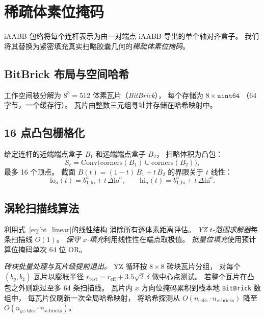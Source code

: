 \documentclass[journal]{IEEEtran}
\begin{document}
\section{稀疏体素位掩码}\label{sec:voxel}

iAABB 包络将每个连杆表示为由一对端点 iAABB 导出的单个轴对齐盒子。
我们将其替换为紧密填充真实扫略胶囊几何的\emph{稀疏体素位掩码}。

\subsection{BitBrick 布局与空间哈希}\label{sec:bitbrick}

工作空间被分解为 $8^3{=}512$ 体素瓦片（\emph{BitBrick}），
每个存储为 $8{\times}\mathtt{uint64}$
（64 字节，一个缓存行）。
瓦片由整数三元组寻址并存储在哈希映射中。

\subsection{16 点凸包栅格化}\label{sec:hull16}

给定连杆的近端端点盒子 $B_1$ 和远端端点盒子 $B_2$，
扫略体积为凸包：
\begin{equation}\label{eq:hull16}
  S_\ell = \mathrm{Conv}\bigl(
    \mathrm{corners}(B_1) \cup \mathrm{corners}(B_2)
  \bigr),
\end{equation}
最多 16 个顶点。
截面 $B(t) = (1{-}t)\,B_1 + t\,B_2$ 的界限关于 $t$ 线性：
\begin{equation}\label{eq:bt_linear}
  \mathrm{lo}_a(t) = b_{1,\mathrm{lo}}^a + t\,\Delta\mathrm{lo}^a, \qquad
  \mathrm{hi}_a(t) = b_{1,\mathrm{hi}}^a + t\,\Delta\mathrm{hi}^a.
\end{equation}

\subsection{涡轮扫描线算法}\label{sec:turbo}

利用式~\eqref{eq:bt_linear}的线性结构
消除所有逐体素距离评估。
\emph{YZ $t$-范围求解器}每条扫描线 $O(1)$。
\emph{保守 $x$-填充}利用线性性在端点取极值。
\emph{批量位填充}使用预计算位掩码单次 64 位 OR。

\emph{砖块批量处理与瓦片级提前退出。}
YZ 循环按 $8{\times}8$ 砖块瓦片分组，
对每个 $(b_y,b_z)$ 瓦片以膨胀半径
$r_{\mathrm{test}} = r_{\mathrm{eff}} + 3.5\sqrt{2}\,\delta$
做中心点测试。
若整个瓦片在凸包之外则跳过至多 64 条扫描线。
瓦片内 $x$ 方向位掩码累积到栈本地 \texttt{BitBrick} 数组中，
每瓦片仅刷新一次全局哈希映射，
将哈希探测从 $O(n_{\mathrm{cells}} \cdot n_{x\text{-bricks}})$
降至 $O(n_{yz\text{-tiles}} \cdot n_{x\text{-bricks}})$。
\end{document}
